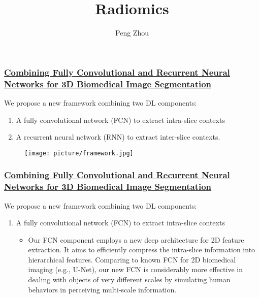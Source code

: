 \documentclass{beamer}
\begin{document}
\title{Radiomics}
\author{Peng Zhou}
\date{}
\maketitle{}


\begin{frame}
  \frametitle{\href{https://arxiv.org/pdf/1609.01006v2.pdf}
    {Combining Fully Convolutional and Recurrent Neural Networks for 3D Biomedical Image Segmentation}}
  We propose a new framework combining two DL components:
  \begin{enumerate}
  \item A fully convolutional network (FCN) to extract intra-slice contexts
  \item A recurrent neural network (RNN) to extract inter-slice contexts.
  \end{enumerate}

  \begin{figure}[!htb]
    \centering
    \texttt{[image: picture/framework.jpg]}
  \end{figure}

  
\end{frame}

\begin{frame}
  \frametitle{\href{https://arxiv.org/pdf/1609.01006v2.pdf}
    {Combining Fully Convolutional and Recurrent Neural Networks for 3D Biomedical Image Segmentation}}
  We propose a new framework combining two DL components:
    \begin{enumerate}
    \item A fully convolutional network (FCN) to extract intra-slice contexts
      \begin{itemize}
      \item Our FCN component employs a new deep architecture for 2D feature extraction. It aims
        to efficiently compress the intra-slice information into hierarchical features. Comparing
        to known FCN for 2D biomedical imaging (e.g., U-Net), our new FCN is considerably more
        effective in dealing with objects of very different scales by simulating human behaviors in
        perceiving multi-scale information.
      \end{itemize}
    \end{enumerate}
\end{frame}
\end{document}
